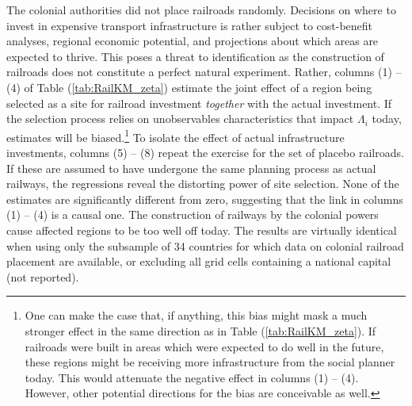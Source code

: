 \documentclass[11pt, oneside]{article}   	%
\let\oldref\ref
\renewcommand{\ref}[1]{(\oldref{#1})}
\begin{document}
The colonial authorities did not place railroads randomly. Decisions on where to invest in expensive transport infrastructure is rather subject to cost-benefit analyses, regional economic potential, and projections about which areas are expected to thrive. This poses a threat to identification as the construction of railroads does not constitute a perfect natural experiment. Rather, columns (1) -- (4) of Table \ref{tab:RailKM_zeta} estimate the joint effect of a region being selected as a site for railroad investment \emph{together} with the actual investment. If the selection process relies on unobservables characteristics that impact $\Lambda_{i}$ today, estimates will be biased.\footnote{One can make the case that, if anything, this bias might mask a much stronger effect in the same direction as in Table \ref{tab:RailKM_zeta}. If railroads were built in areas which were expected to do well in the future, these regions might be receiving more infrastructure from the social planner today. This would attenuate the negative effect in columns (1) -- (4). However, other potential directions for the bias are conceivable as well.} To isolate the effect of actual infrastructure investments, columns (5) -- (8) repeat the exercise for the set of placebo railroads. If these are assumed to have undergone the same planning process as actual railways, the regressions reveal the distorting power of site selection. None of the estimates are significantly different from zero, suggesting that the link in columns (1) -- (4) is a causal one. The construction of railways by the colonial powers cause affected regions to be too well off today. The results are virtually identical when using only the subsample of 34 countries for which data on colonial railroad placement are available, or excluding all grid cells containing a national capital (not reported).
\end{document}
